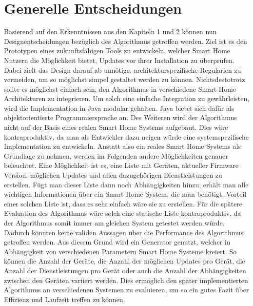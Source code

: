 \section{Generelle Entscheidungen}
Basierend auf den Erkenntnissen aus den Kapiteln 1 und 2 können nun Designentscheidungen bezüglich des Algorithmus getroffen
werden. Ziel ist es den Prototypen eines zukunftsfähigen Tools zu entwickeln, welcher Smart Home Nutzern die Möglichkeit bietet,
Updates vor ihrer Installation zu überprüfen.
Dabei zielt das Design darauf ab unnötige, architekturspezifische Regularien zu vermeiden, um so möglichst simpel
gestaltet werden zu können. Nichtsdestotrotz sollte es möglichst einfach sein, den Algorithmus in verschiedene Smart Home 
Architekturen zu integrieren. Um solch eine einfache Integration zu gewährleisten, wird die Implementation
in Java modular gehalten. Java bietet sich dafür als objektorientierte Programmiersprache an.
Des Weiteren wird der Algorithmus nicht auf der Basis eines realen Smart Home Systems aufgebaut. Dies wäre kontraproduktiv,
da man als Entwickler dazu neigen würde eine systemspezifische Implementation zu entwickeln. Anstatt also ein reales
Smart Home Systems als Grundlage zu nehmen, werden im Folgenden andere Möglichkeiten genauer beleuchtet. 
Eine Möglichkeit ist es, eine Liste mit 
Geräten, aktueller Firmware Version, möglichen Updates und allen dazugehörigen Dienstleistungen zu erstellen. Fügt
man dieser Liste dann noch Abhängigkeiten hinzu, erhält man alle wichtigen Informationen über ein Smart Home System,
die man benötigt. Vorteil einer solchen Liste ist, dass es sehr einfach wäre sie zu erstellen. Für die spätere Evaluation des 
Algorithmus wäre solch eine statische Liste kontraproduktiv, da der Algorithmus somit immer am gleichen 
System getestet werden würde. Dadurch könnten keine validen Aussagen über die Performance des Algorithmus getroffen werden. Aus 
diesem Grund wird ein Generator genutzt, welcher in Abhängigkeit von verschiedenen Parametern Smart Home Systeme kreiert.
So können die Anzahl der Geräte, die Anzahl der möglichen 
Updates pro Gerät, die Anzahl der Dienstleistungen pro Gerät oder auch die Anzahl der Abhängigkeiten zwischen den
Geräten variiert werden. Dies ermöglich den später implementierten Algorithmus an verschiedenen Systemen zu 
evaluieren, um so ein gutes Fazit über Effizienz und Laufzeit treffen zu können. 

